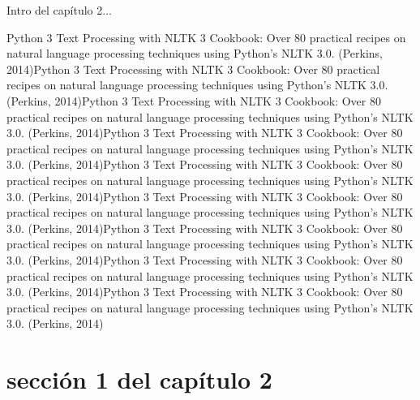 Intro del capítulo 2...

Python 3 Text Processing with NLTK 3 Cookbook: Over 80 practical recipes on natural language processing techniques using Python's NLTK 3.0. (Perkins, 2014)Python 3 Text Processing with NLTK 3 Cookbook: Over 80 practical recipes on natural language processing techniques using Python's NLTK 3.0. (Perkins, 2014)Python 3 Text Processing with NLTK 3 Cookbook: Over 80 practical recipes on natural language processing techniques using Python's NLTK 3.0. (Perkins, 2014)Python 3 Text Processing with NLTK 3 Cookbook: Over 80 practical recipes on natural language processing techniques using Python's NLTK 3.0. (Perkins, 2014)Python 3 Text Processing with NLTK 3 Cookbook: Over 80 practical recipes on natural language processing techniques using Python's NLTK 3.0. (Perkins, 2014)Python 3 Text Processing with NLTK 3 Cookbook: Over 80 practical recipes on natural language processing techniques using Python's NLTK 3.0. (Perkins, 2014)Python 3 Text Processing with NLTK 3 Cookbook: Over 80 practical recipes on natural language processing techniques using Python's NLTK 3.0. (Perkins, 2014)Python 3 Text Processing with NLTK 3 Cookbook: Over 80 practical recipes on natural language processing techniques using Python's NLTK 3.0. (Perkins, 2014)Python 3 Text Processing with NLTK 3 Cookbook: Over 80 practical recipes on natural language processing techniques using Python's NLTK 3.0. (Perkins, 2014)
\cite{mikolov}

\section{sección 1 del capítulo 2}

